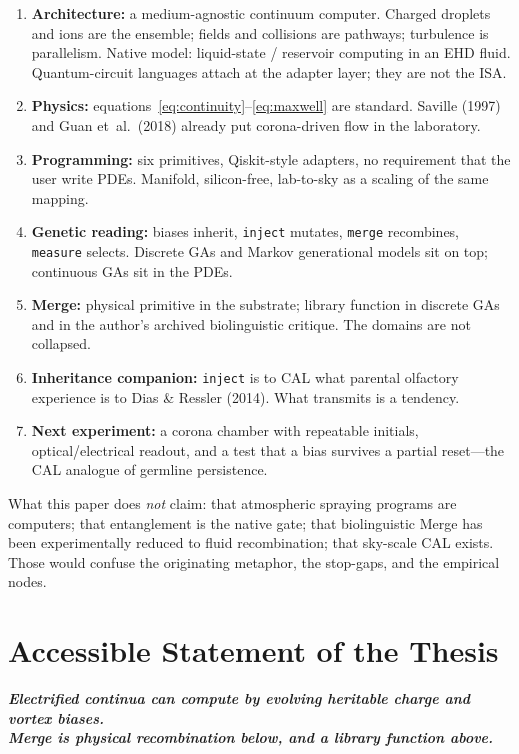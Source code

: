 \documentclass[11pt,a4paper]{article}
\begin{document}
\begin{enumerate}[leftmargin=1.4em]
\item \textbf{Architecture:} a medium-agnostic continuum computer. Charged droplets and ions are the ensemble; fields and collisions are pathways; turbulence is parallelism. Native model: liquid-state / reservoir computing in an EHD fluid. Quantum-circuit languages attach at the adapter layer; they are not the ISA.
\item \textbf{Physics:} equations~\eqref{eq:continuity}--\eqref{eq:maxwell} are standard. Saville (1997) and Guan et~al.\ (2018) already put corona-driven flow in the laboratory.
\item \textbf{Programming:} six primitives, Qiskit-style adapters, no requirement that the user write PDEs. Manifold, silicon-free, lab-to-sky as a scaling of the same mapping.
\item \textbf{Genetic reading:} biases inherit, \texttt{inject} mutates, \texttt{merge} recombines, \texttt{measure} selects. Discrete GAs and Markov generational models sit on top; continuous GAs sit in the PDEs.
\item \textbf{Merge:} physical primitive in the substrate; library function in discrete GAs and in the author's archived biolinguistic critique. The domains are not collapsed.
\item \textbf{Inheritance companion:} \texttt{inject} is to CAL what parental olfactory experience is to Dias \& Ressler (2014). What transmits is a tendency.
\item \textbf{Next experiment:} a corona chamber with repeatable initials, optical/electrical readout, and a test that a bias survives a partial reset---the CAL analogue of germline persistence.
\end{enumerate}

What this paper does \emph{not} claim: that atmospheric spraying programs are computers; that entanglement is the native gate; that biolinguistic Merge has been experimentally reduced to fluid recombination; that sky-scale CAL exists. Those would confuse the originating metaphor, the stop-gaps, and the empirical nodes.

\section{Accessible Statement of the Thesis}
\begin{center}
\large\textit{\textbf{Electrified continua can compute by evolving heritable charge and vortex biases.\\
Merge is physical recombination below, and a library function above.}}
\end{center}
\end{document}
